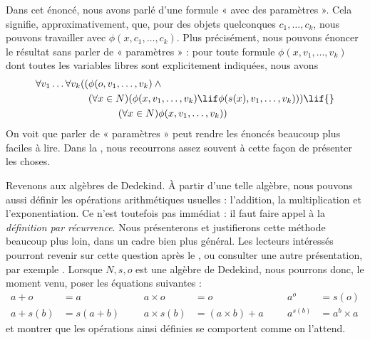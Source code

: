 \documentclass[../../../include/open-logic-section]{subfiles}
\begin{document}
Dans cet énoncé, nous avons parlé d'une formule « avec des paramètres ».
Cela signifie, approximativement, que, pour des objets quelconques
$c_1,\ldots,c_k$, nous pouvons travailler avec
$\phi(x,c_1,\ldots,c_k)$. Plus précisément, nous pouvons énoncer le
résultat sans parler de « paramètres » : pour toute formule
$\phi(x,v_1,\ldots,v_k)$ dont toutes les variables libres sont
explicitement indiquées, nous avons
	\begin{align*}
			\forall v_1 \ldots \forall v_k((&\phi(o, v_1,\ldots, v_k) \land {}\\
			&	(\forall x \in N)(\phi(x,v_1, \ldots, v_k) \lif \phi(s(x), v_1,\ldots, v_k))) \lif {}\\
			&\hspace{3em} (\forall x \in N)\phi(x, v_1,\ldots, v_k))
	\end{align*}
On voit que parler de « paramètres » peut rendre les énoncés beaucoup
plus faciles à lire. Dans la , nous recourrons assez
souvent à cette façon de présenter les choses.

Revenons aux algèbres de Dedekind. À partir d'une telle algèbre, nous
pouvons aussi définir les opérations arithmétiques usuelles :
l'addition, la multiplication et l'exponentiation. Ce n'est toutefois
pas immédiat : il faut faire appel à la \emph{définition par récurrence}.
Nous présenterons et justifierons cette méthode beaucoup plus loin,
dans un cadre bien plus général. Les lecteurs intéressés pourront
revenir sur cette question après le ,
ou consulter une autre présentation, par exemple
\citealt[pp.~95--8]{Potter2004}. Lorsque $N,s,o$ est une algèbre de
Dedekind, nous pourrons donc, le moment venu, poser les équations
suivantes :
\begin{align*}
	{a} + {o} &= {a} & & & {a} \times {o} &= {o} & & & {a}^{o} &= s(o)\\
{a} + {s}({b}) &= {s}({a}+{b}) &&& {a} \times {s}({b}) &= ({a}\times {b}) + {a}  & & & {a}^{{s}({b})} &= {a}^{b} \times {a}
\end{align*}
et montrer que les opérations ainsi définies se comportent comme
on l'attend.
\end{document}
